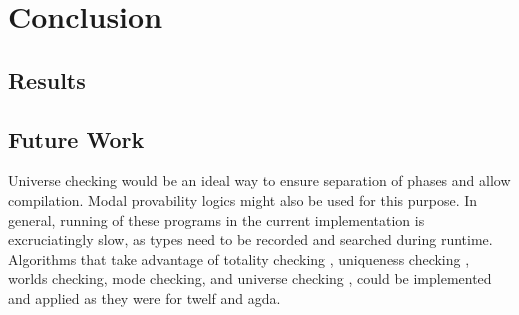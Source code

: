 \section{Conclusion}

\subsection{Results}

\subsection{Future Work}

Universe checking would be an ideal way to ensure separation of phases and allow compilation. 
Modal provability logics might also be used for this purpose.  
In general, running of these programs in the current implementation is excruciatingly slow, 
as types need to be recorded and searched during runtime.  
Algorithms that take advantage of totality checking \citep{altenkirch2010termination}, 
uniqueness checking \citep{anderson2004verifying}, 
worlds checking\citep{anderson2004verifying}, 
mode checking\citep{anderson2004verifying}, 
and universe checking \citep{harper1991type}, 
could be implemented and applied as they were for twelf and agda.  

